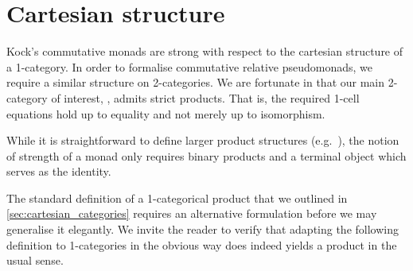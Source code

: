 \section{Cartesian structure}\label{sec:bicartesian_2categories}

Kock's commutative monads are strong with respect to the cartesian structure
of a 1-category. In order to formalise commutative relative pseudomonads, we require
a similar structure on 2-categories. We are fortunate in that our main 2-category
of interest, \biCAT, admits strict products. That is, the required 1-cell equations
hold up to equality and not merely up to isomorphism.

While it is straightforward to define larger product structures
(e.g.~\cite{saville2020}), the notion of strength of a monad only
requires binary products and a terminal object which serves as the
identity.

The standard definition of a 1-categorical product that we outlined in
\ref{sec:cartesian_categories} requires an alternative formulation
before we may generalise it elegantly. We invite the reader to verify
that adapting the following definition to 1-categories in the obvious
way does indeed yields a product in the usual sense.

